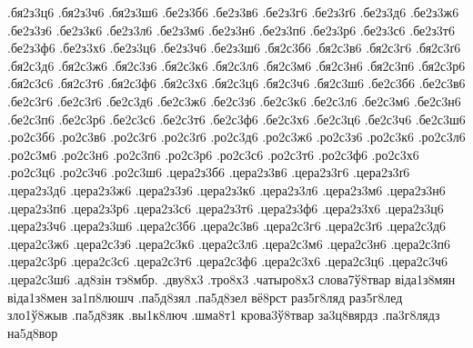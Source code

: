 {.бя2з3ц6
.бя2з3ч6
.бя2з3ш6
.бе2з3б6
.бе2з3в6
.бе2з3г6
.бе2з3ґ6
.бе2з3д6
.бе2з3ж6
.бе2з3з6
.бе2з3к6
.бе2з3л6
.бе2з3м6
.бе2з3н6
.бе2з3п6
.бе2з3р6
.бе2з3с6
.бе2з3т6
.бе2з3ф6
.бе2з3х6
.бе2з3ц6
.бе2з3ч6
.бе2з3ш6
.бя2с3б6
.бя2с3в6
.бя2с3г6
.бя2с3ґ6
.бя2с3д6
.бя2с3ж6
.бя2с3з6
.бя2с3к6
.бя2с3л6
.бя2с3м6
.бя2с3н6
.бя2с3п6
.бя2с3р6
.бя2с3с6
.бя2с3т6
.бя2с3ф6
.бя2с3х6
.бя2с3ц6
.бя2с3ч6
.бя2с3ш6
.бе2с3б6
.бе2с3в6
.бе2с3г6
.бе2с3ґ6
.бе2с3д6
.бе2с3ж6
.бе2с3з6
.бе2с3к6
.бе2с3л6
.бе2с3м6
.бе2с3н6
.бе2с3п6
.бе2с3р6
.бе2с3с6
.бе2с3т6
.бе2с3ф6
.бе2с3х6
.бе2с3ц6
.бе2с3ч6
.бе2с3ш6
.ро2с3б6
.ро2с3в6
.ро2с3г6
.ро2с3ґ6
.ро2с3д6
.ро2с3ж6
.ро2с3з6
.ро2с3к6
.ро2с3л6
.ро2с3м6
.ро2с3н6
.ро2с3п6
.ро2с3р6
.ро2с3с6
.ро2с3т6
.ро2с3ф6
.ро2с3х6
.ро2с3ц6
.ро2с3ч6
.ро2с3ш6
.цера2з3б6
.цера2з3в6
.цера2з3г6
.цера2з3ґ6
.цера2з3д6
.цера2з3ж6
.цера2з3з6
.цера2з3к6
.цера2з3л6
.цера2з3м6
.цера2з3н6
.цера2з3п6
.цера2з3р6
.цера2з3с6
.цера2з3т6
.цера2з3ф6
.цера2з3х6
.цера2з3ц6
.цера2з3ч6
.цера2з3ш6
.цера2с3б6
.цера2с3в6
.цера2с3г6
.цера2с3ґ6
.цера2с3д6
.цера2с3ж6
.цера2с3з6
.цера2с3к6
.цера2с3л6
.цера2с3м6
.цера2с3н6
.цера2с3п6
.цера2с3р6
.цера2с3с6
.цера2с3т6
.цера2с3ф6
.цера2с3х6
.цера2с3ц6
.цера2с3ч6
.цера2с3ш6
.ад8зін
тэ8мбр.
.дву8х3
.тро8х3
.чатыро8х3
слова7ў8твар
віда1з8мян
віда1з8мен
за1п8люшч
.па5д8зял
.па5д8зел
вё8рст
раз5г8ляд
раз5г8лед
зло1ў8жыв
.па5д8зяк
.вы1к8люч
.шма8т1
крова3ў8твар
за3ц8вярдз
.па3г8лядз
на5д8вор
}

